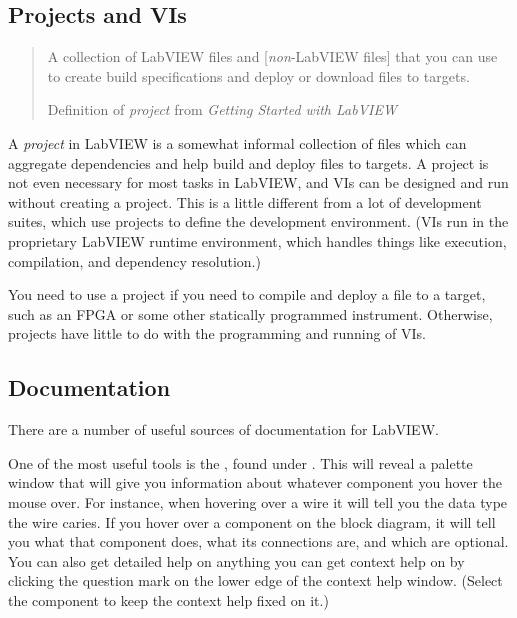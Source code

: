 \subsection{Projects and VIs}
\label{sec:eq_labview:projects_vis}

\begin{quote}
  A collection of LabVIEW files and [\textit{non}-LabVIEW files] that
  you can use to create build specifications and deploy or download
  files to targets.
  \begin{flushright}\dashem Definition of \textit{project} from \textit{Getting Started with LabVIEW}\end{flushright}
\end{quote}

A \textit{project} in LabVIEW is a somewhat informal collection of files which can aggregate dependencies and help build and deploy files to targets.  A project is not even necessary for most tasks in LabVIEW, and VIs can be designed and run without creating a project.  This is a little different from a lot of development suites, which use projects to define the development environment.  (VIs run in the proprietary LabVIEW runtime environment, which handles things like execution, compilation, and dependency resolution.)  

You need to use a project if you need to compile and deploy a file to a target, such as an FPGA or some other statically programmed instrument.  Otherwise, projects have little to do with the programming and running of VIs.


\subsection{Documentation}
\label{sec:eq_labview:docs}

There are a number of useful sources of documentation for LabVIEW.

One of the most useful tools is the , found under .  This will reveal a palette window that will give you information about whatever component you hover the mouse over.  For instance, when hovering over a wire it will tell you the data type the wire caries.  If you hover over a component on the block diagram, it will tell you what that component does, what its connections are, and which are optional.  You can also get detailed help on anything you can get context help on by clicking the question mark on the lower edge of the context help window.  (Select the component to keep the context help fixed on it.)

